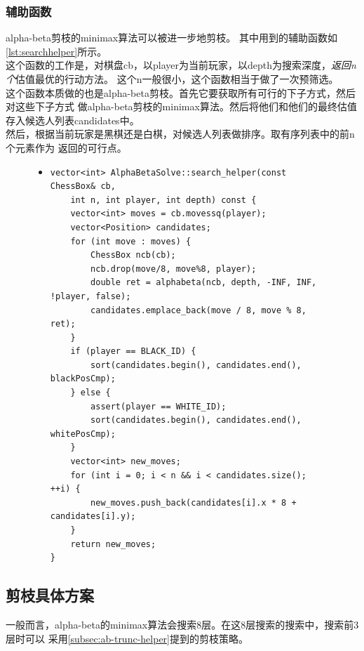\documentclass[a4paper]{article}
\begin{document}
\subsubsection{辅助函数}\label{subsec:ab-trunc-helper}
alpha-beta剪枝的minimax算法可以被进一步地剪枝。
其中用到的辅助函数如\autoref{lst:searchhelper}所示。\\

这个函数的工作是，对棋盘cb，以player为当前玩家，以depth为搜索深度，\emph{返回n个}估值最优的行动方法。
这个n一般很小，这个函数相当于做了一次预筛选。\\

这个函数本质做的也是alpha-beta剪枝。首先它要获取所有可行的下子方式，然后对这些下子方式
做alpha-beta剪枝的minimax算法。然后将他们和他们的最终估值存入候选人列表candidates中。\\

然后，根据当前玩家是黑棋还是白棋，对候选人列表做排序。取有序列表中的前n个元素作为
返回的可行点。\\

\begin{figure}[!hbt]
\begin{itemize}
\item[] \begin{lstlisting}[style=mycpp, label=lst:searchhelper, caption=行动方案预筛选函数]
vector<int> AlphaBetaSolve::search_helper(const ChessBox& cb, 
    int n, int player, int depth) const {
    vector<int> moves = cb.movessq(player);
    vector<Position> candidates;
    for (int move : moves) {
        ChessBox ncb(cb);
        ncb.drop(move/8, move%8, player);
        double ret = alphabeta(ncb, depth, -INF, INF, !player, false);
        candidates.emplace_back(move / 8, move % 8, ret);
    }
    if (player == BLACK_ID) {
        sort(candidates.begin(), candidates.end(), blackPosCmp);
    } else {
        assert(player == WHITE_ID);
        sort(candidates.begin(), candidates.end(), whitePosCmp);
    }
    vector<int> new_moves;
    for (int i = 0; i < n && i < candidates.size(); ++i) {
        new_moves.push_back(candidates[i].x * 8 + candidates[i].y);
    }
    return new_moves;
}
\end{lstlisting}
\end{itemize}
\end{figure}

\subsection{剪枝具体方案}
一般而言，alpha-beta的minimax算法会搜索8层。在这8层搜索的搜索中，搜索前3层时可以
采用\autoref{subsec:ab-trunc-helper}提到的剪枝策略。\\
\end{document}
